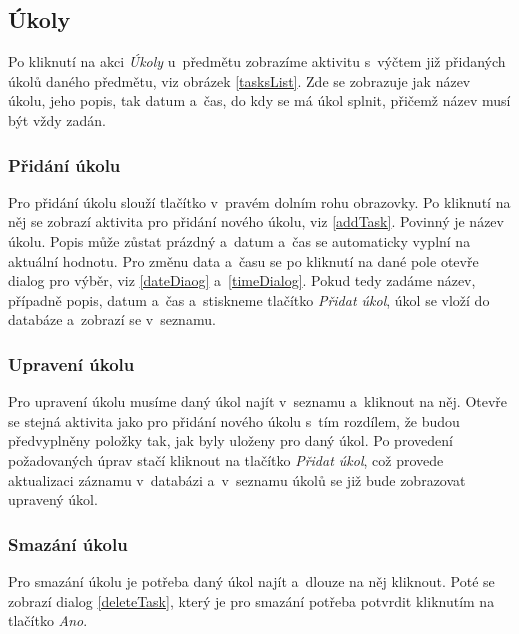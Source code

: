 \documentclass[12pt, a4paper]{article}
\begin{document}
		\subsection{Úkoly}
		Po kliknutí na akci \emph{Úkoly} u~předmětu zobrazíme aktivitu s~výčtem již přidaných úkolů daného předmětu, viz obrázek \ref{tasksList}. Zde se zobrazuje jak název úkolu, jeho popis, tak datum a~čas, do kdy se má úkol splnit, přičemž název musí být vždy zadán.
		
			\subsubsection{Přidání úkolu}
			Pro přidání úkolu slouží tlačítko  v~pravém dolním rohu obrazovky. Po kliknutí na něj se zobrazí aktivita pro přidání nového úkolu, viz \ref{addTask}. Povinný je název úkolu. Popis může zůstat prázdný a~datum a~čas se automaticky vyplní na aktuální hodnotu. Pro změnu data a~času se po kliknutí na dané pole otevře dialog pro výběr, viz \ref{dateDiaog} a~\ref{timeDialog}. Pokud tedy zadáme název, případně popis, datum a~čas a~stiskneme tlačítko \emph{Přidat úkol}, úkol se vloží do databáze a~zobrazí se v~seznamu.
			
			\subsubsection{Upravení úkolu}
			Pro upravení úkolu musíme daný úkol najít v~seznamu a~kliknout na něj. Otevře se stejná aktivita jako pro přidání nového úkolu s~tím rozdílem, že budou předvyplněny položky tak, jak byly uloženy pro daný úkol. Po provedení požadovaných úprav stačí kliknout na tlačítko \emph{Přidat úkol}, což provede aktualizaci záznamu v~databázi a~v~seznamu úkolů se již bude zobrazovat upravený úkol.
			
			\subsubsection{Smazání úkolu}
			Pro smazání úkolu je potřeba daný úkol najít a~dlouze na něj kliknout. Poté se zobrazí dialog \ref{deleteTask}, který je pro smazání potřeba potvrdit kliknutím na tlačítko \emph{Ano}.
		
\end{document}
